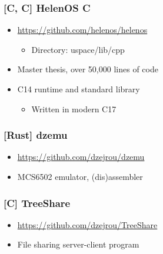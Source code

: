 \documentclass[8pt]{article}
\def\cpp{{C\nolinebreak[4]\hspace{-.05em}\raisebox{.4ex}{\tiny\bf ++\xspace}}}
\newcommand\csharp{C\scalerel*{\#}{X}}
\begin{document}
\begin{minipage}[t]{0.45\textwidth}
    \centering

    \subsubsection*{[\cpp, C] HelenOS \cpp}
    \begin{itemize}
        \item \url{https://github.com/helenos/helenos}
        \begin{itemize}
            \item Directory: uspace/lib/cpp
        \end{itemize}
        \item Master thesis, over 50,000 lines of code
        \item \cpp14 runtime and standard library
        \begin{itemize}
            \item Written in modern \cpp17
        \end{itemize}
    \end{itemize}

    \subsubsection*{[Rust] dzemu}
    \begin{itemize}
        \item \url{https://github.com/dzejrou/dzemu}
        \item MCS6502 emulator, (dis)assembler
    \end{itemize}

    \subsubsection*{[\csharp] TreeShare}
    \begin{itemize}
        \item \url{https://github.com/dzejrou/TreeShare}
        \item File sharing server-client program
    \end{itemize}
\end{minipage}%
\hfill
\end{document}
